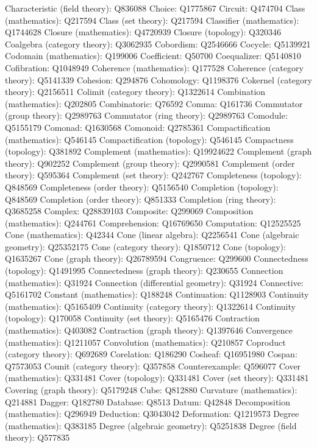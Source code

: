 Characteristic (field theory): Q836088
Choice: Q1775867
Circuit: Q474704
Class (mathematics): Q217594
Class (set theory): Q217594
Classifier (mathematics): Q1744628
Closure (mathematics): Q4720939
Closure (topology): Q320346
Coalgebra (category theory): Q3062935
Cobordism: Q2546666
Cocycle: Q5139921
Codomain (mathematics): Q199006
Coefficient: Q50700
Coequalizer: Q5140810
Cofibration: Q1048949
Coherence (mathematics): Q177528
Coherence (category theory): Q5141339
Cohesion: Q294876
Cohomology: Q1198376
Cokernel (category theory): Q2156511
Colimit (category theory): Q1322614
Combination (mathematics): Q202805
Combinatoric: Q76592
Comma: Q161736
Commutator (group theory): Q2989763
Commutator (ring theory): Q2989763
Comodule: Q5155179
Comonad: Q1630568
Comonoid: Q2785361
Compactification (mathematics): Q546145
Compactification (topology): Q546145
Compactness (topology): Q381892
Complement (mathematics): Q19924622
Complement (graph theory): Q902252
Complement (group theory): Q2990581
Complement (order theory): Q595364
Complement (set theory): Q242767
Completeness (topology): Q848569
Completeness (order theory): Q5156540
Completion (topology): Q848569
Completion (order theory): Q851333
Completion (ring theory): Q3685258
Complex: Q28839103
Composite: Q299069
Composition (mathematics): Q244761
Comprehension: Q16769650
Computation: Q12525525
Cone (mathematics): Q42344
Cone (linear algebra): Q2256541
Cone (algebraic geometry): Q25352175
Cone (category theory): Q1850712
Cone (topology): Q1635267
Cone (graph theory): Q26789594
Congruence: Q299600
Connectedness (topology): Q1491995
Connectedness (graph theory): Q230655
Connection (mathematics): Q31924
Connection (differential geometry): Q31924
Connective: Q5161702
Constant (mathematics): Q188248
Continuation: Q1128903
Continuity (mathematics): Q5165409
Continuity (category theory): Q1322614
Continuity (topology): Q170058
Continuity (set theory): Q5165476
Contraction (mathematics): Q403082
Contraction (graph theory): Q1397646
Convergence (mathematics): Q1211057
Convolution (mathematics): Q210857
Coproduct (category theory): Q692689
Corelation: Q186290
Cosheaf: Q16951980
Cospan: Q7573053
Counit (category theory): Q357858
Counterexample: Q596077
Cover (mathematics): Q331481
Cover (topology): Q331481
Cover (set theory): Q331481
Covering (graph theory): Q5179248
Cube: Q812880
Curvature (mathematics): Q214881
Dagger: Q182780
Database: Q8513
Datum: Q42848
Decomposition (mathematics): Q296949
Deduction: Q3043042
Deformation: Q1219573
Degree (mathematics): Q383185
Degree (algebraic geometry): Q5251838
Degree (field theory): Q577835
